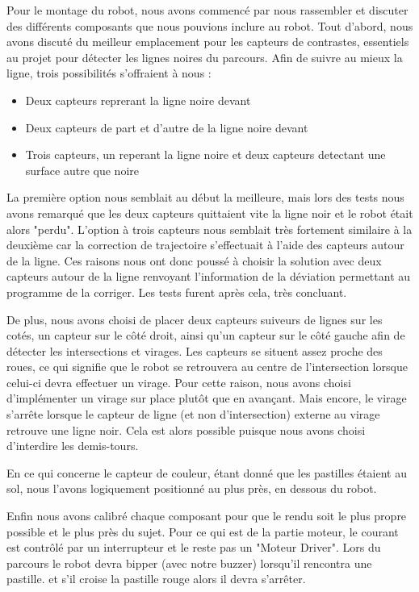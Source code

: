 \documentclass[11pt,a4paper]{article}
\begin{document}
Pour le montage du robot, nous avons commencé par nous rassembler et discuter des différents composants que nous pouvions inclure au robot.
Tout d'abord, nous avons discuté du meilleur emplacement pour les capteurs de contrastes, essentiels au projet pour détecter les lignes noires du parcours.
Afin de suivre au mieux la ligne, trois possibilités s'offraient à nous :
\begin{itemize}
    \item Deux capteurs reprerant la ligne noire devant
    \item Deux capteurs de part et d'autre de la ligne noire devant
    \item Trois capteurs, un reperant la ligne noire et deux capteurs detectant une surface autre que noire 
\end{itemize}
La première option nous semblait au début la meilleure, mais lors des tests nous avons remarqué que les deux capteurs quittaient vite la ligne noir et le robot était alors "perdu". L'option à trois capteurs nous semblait très fortement similaire à la deuxième car la correction de trajectoire s'effectuait à l'aide des capteurs autour de la ligne. 
Ces raisons nous ont donc poussé à choisir la solution avec deux capteurs autour de la ligne renvoyant l'information de la déviation permettant au programme de la corriger. 
Les tests furent après cela, très concluant.

De plus, nous avons choisi de placer deux capteurs suiveurs de lignes sur les cotés, un capteur sur le côté droit, ainsi qu'un capteur sur le côté gauche afin de détecter les intersections et virages. 
Les capteurs se situent assez proche des roues, ce qui signifie que le robot se retrouvera au centre de l'intersection lorsque celui-ci devra effectuer un virage. 
Pour cette raison, nous avons choisi d'implémenter un virage sur place plutôt que en avançant. 
Mais encore, le virage s'arrête lorsque le capteur de ligne (et non d'intersection) externe au virage retrouve une ligne noir.
Cela est alors possible puisque nous avons choisi d'interdire les demis-tours.

En ce qui concerne le capteur de couleur, étant donné que les pastilles étaient au sol, nous l'avons logiquement positionné au plus près, en dessous du robot.

Enfin nous avons calibré chaque composant pour que le rendu soit le plus propre possible et le plus près du sujet.
Pour ce qui est de la partie moteur, le courant est contrôlé par un interrupteur et le reste pas un "Moteur Driver". 
Lors du parcours le robot devra bipper (avec notre buzzer) lorsqu'il rencontra une pastille. et s'il croise la pastille rouge alors il devra s'arrêter.
\end{document}
